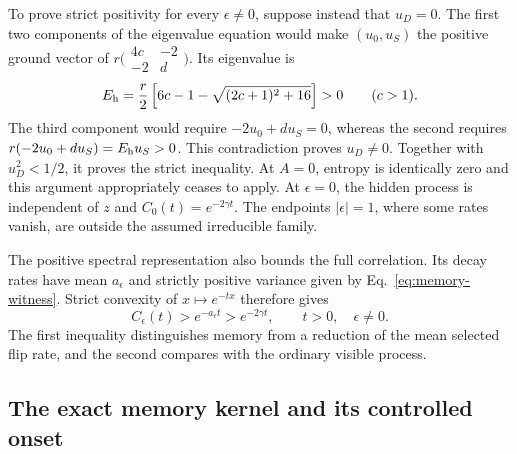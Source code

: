 \documentclass[aps,pre,reprint,amsmath,amssymb,longbibliography,floatfix]{revtex4-2}
\begin{document}
To prove strict positivity for every $\epsilon\ne0$, suppose instead
that $u_D=0$. The first two components of the eigenvalue equation would
make $(u_0,u_S)$ the positive ground vector of
$r\bigl(\begin{smallmatrix}4c&-2\\-2&d\end{smallmatrix}\bigr)$.
Its eigenvalue is
\begin{equation}
 E_{\rm h}=\frac r2
 \left[6c-1-\sqrt{(2c+1)^2+16}\right]>0
 \qquad(c>1).
 \label{eq:memory-base-cost}
\end{equation}
The third component would require $-2u_0+d u_S=0$, whereas the
second requires $r(-2u_0+d u_S)=E_{\rm h}u_S>0$.
This contradiction proves $u_D\ne0$. Together with $u_D^2<1/2$, it
proves the strict inequality. At $A=0$, entropy is identically zero
and this argument appropriately ceases to apply. At $\epsilon=0$,
the hidden process is independent of $z$ and
$C_0(t)=e^{-2\gamma t}$. The endpoints $|\epsilon|=1$, where some
rates vanish, are outside the assumed irreducible family.

The positive spectral representation also bounds the full correlation.
Its decay rates have mean $a_\epsilon$ and strictly positive variance
given by Eq.~\eqref{eq:memory-witness}. Strict convexity of
$x\mapsto e^{-tx}$ therefore gives
\begin{equation}
 C_\epsilon(t)>e^{-a_\epsilon t}>e^{-2\gamma t},
 \qquad t>0,\quad\epsilon\ne0.
 \label{eq:memory-persistence-bound}
\end{equation}
The first inequality distinguishes memory from a reduction of the
mean selected flip rate, and the second compares with the ordinary
visible process.

\subsection{The exact memory kernel and its controlled onset}
\end{document}
